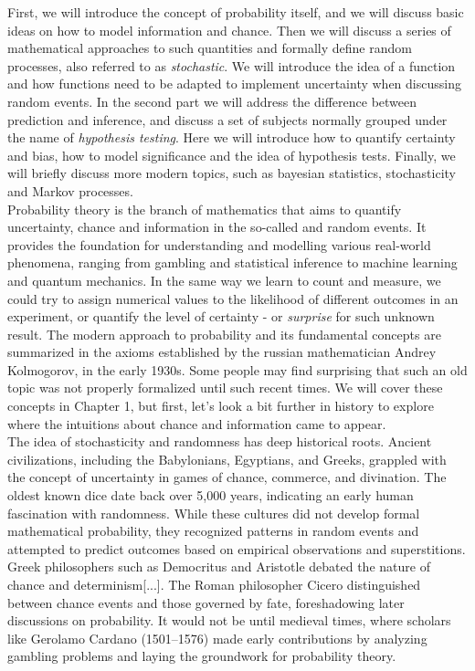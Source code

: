 \documentclass{book}
\begin{document}
First, we will introduce the concept of probability itself, and we will discuss basic ideas on how to model information and chance. Then we will discuss a series of mathematical approaches to such quantities and formally define random processes, also referred to as \textit{stochastic}. We will introduce the idea of a function and how functions need to be adapted to implement uncertainty when discussing random events. In the second part we will address the difference between prediction and inference, and discuss a set of subjects normally grouped under the name of \textit{hypothesis testing}. Here we will introduce how to quantify certainty and bias, how to model significance and the idea of hypothesis tests. Finally, we will briefly discuss more modern topics, such as bayesian statistics, stochasticity and Markov processes.\\

Probability theory is the branch of mathematics that aims to quantify uncertainty, chance and information in the so-called and random events. It provides the foundation for understanding and modelling various real-world phenomena, ranging from gambling and statistical inference to machine learning and quantum mechanics. In the same way we learn to count and measure, we could try to assign numerical values to the likelihood of different outcomes in an experiment, or quantify the level of certainty - or \textit{surprise} for such unknown result. The modern approach to probability and its fundamental concepts are summarized in the axioms established by the russian mathematician Andrey Kolmogorov, in the early 1930s. Some people may find surprising that such an old topic was not properly formalized until such recent times. We will cover these concepts in Chapter 1, but first, let's look a bit further in history to explore where the intuitions about chance and information came to appear.\\

The idea of stochasticity and randomness has deep historical roots. Ancient civilizations, including the Babylonians, Egyptians, and Greeks, grappled with the concept of uncertainty in games of chance, commerce, and divination. The oldest known dice date back over 5,000 years, indicating an early human fascination with randomness. While these cultures did not develop formal mathematical probability, they recognized patterns in random events and attempted to predict outcomes based on empirical observations and superstitions.\\
Greek philosophers such as Democritus and Aristotle debated the nature of chance and determinism[...]. The Roman philosopher Cicero distinguished between chance events and those governed by fate, foreshadowing later discussions on probability. It would not be until medieval times, where scholars like Gerolamo Cardano (1501–1576) made early contributions by analyzing gambling problems and laying the groundwork for probability theory.\\
\end{document}
